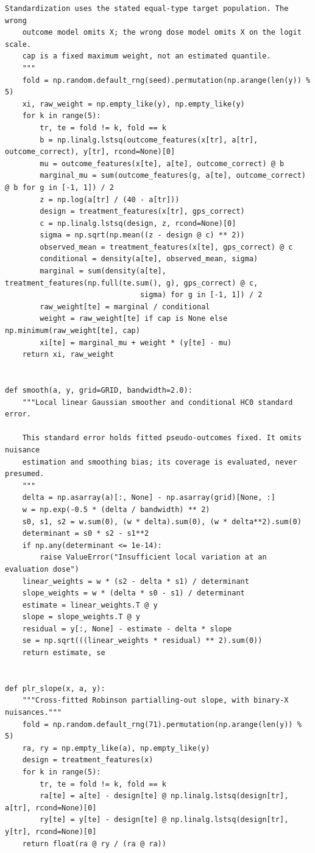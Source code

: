 \begin{Verbatim}[breaklines,breakanywhere,fontsize=\small]
    Standardization uses the stated equal-type target population. The wrong
    outcome model omits X; the wrong dose model omits X on the logit scale.
    cap is a fixed maximum weight, not an estimated quantile.
    """
    fold = np.random.default_rng(seed).permutation(np.arange(len(y)) % 5)
    xi, raw_weight = np.empty_like(y), np.empty_like(y)
    for k in range(5):
        tr, te = fold != k, fold == k
        b = np.linalg.lstsq(outcome_features(x[tr], a[tr], outcome_correct), y[tr], rcond=None)[0]
        mu = outcome_features(x[te], a[te], outcome_correct) @ b
        marginal_mu = sum(outcome_features(g, a[te], outcome_correct) @ b for g in [-1, 1]) / 2
        z = np.log(a[tr] / (40 - a[tr]))
        design = treatment_features(x[tr], gps_correct)
        c = np.linalg.lstsq(design, z, rcond=None)[0]
        sigma = np.sqrt(np.mean((z - design @ c) ** 2))
        observed_mean = treatment_features(x[te], gps_correct) @ c
        conditional = density(a[te], observed_mean, sigma)
        marginal = sum(density(a[te], treatment_features(np.full(te.sum(), g), gps_correct) @ c,
                               sigma) for g in [-1, 1]) / 2
        raw_weight[te] = marginal / conditional
        weight = raw_weight[te] if cap is None else np.minimum(raw_weight[te], cap)
        xi[te] = marginal_mu + weight * (y[te] - mu)
    return xi, raw_weight


def smooth(a, y, grid=GRID, bandwidth=2.0):
    """Local linear Gaussian smoother and conditional HC0 standard error.

    This standard error holds fitted pseudo-outcomes fixed. It omits nuisance
    estimation and smoothing bias; its coverage is evaluated, never presumed.
    """
    delta = np.asarray(a)[:, None] - np.asarray(grid)[None, :]
    w = np.exp(-0.5 * (delta / bandwidth) ** 2)
    s0, s1, s2 = w.sum(0), (w * delta).sum(0), (w * delta**2).sum(0)
    determinant = s0 * s2 - s1**2
    if np.any(determinant <= 1e-14):
        raise ValueError("Insufficient local variation at an evaluation dose")
    linear_weights = w * (s2 - delta * s1) / determinant
    slope_weights = w * (delta * s0 - s1) / determinant
    estimate = linear_weights.T @ y
    slope = slope_weights.T @ y
    residual = y[:, None] - estimate - delta * slope
    se = np.sqrt(((linear_weights * residual) ** 2).sum(0))
    return estimate, se


def plr_slope(x, a, y):
    """Cross-fitted Robinson partialling-out slope, with binary-X nuisances."""
    fold = np.random.default_rng(71).permutation(np.arange(len(y)) % 5)
    ra, ry = np.empty_like(a), np.empty_like(y)
    design = treatment_features(x)
    for k in range(5):
        tr, te = fold != k, fold == k
        ra[te] = a[te] - design[te] @ np.linalg.lstsq(design[tr], a[tr], rcond=None)[0]
        ry[te] = y[te] - design[te] @ np.linalg.lstsq(design[tr], y[tr], rcond=None)[0]
    return float(ra @ ry / (ra @ ra))



\end{Verbatim}

